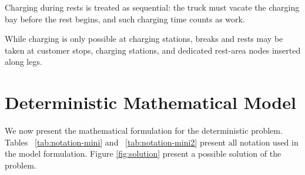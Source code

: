 Charging during rests is treated as sequential: the truck must vacate the charging bay before the rest begins, and such charging time counts as work.

While charging is only possible at charging stations,  breaks and rests may be taken at customer stops, charging stations, and dedicated rest-area nodes inserted along legs.

\section{Deterministic Mathematical Model} \label{sec:model}
We now present the mathematical formulation for the deterministic problem. Tables ~\ref{tab:notation-mini} and ~\ref{tab:notation-mini2} present all notation used in the model formulation. Figure \ref{fig:solution} present a possible solution of the problem.

